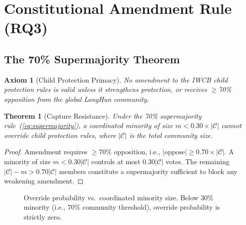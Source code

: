 \documentclass[conference]{IEEEtran}
\newtheorem{theorem}{Theorem}
\newtheorem{axiom}{Axiom}
\begin{document}
\section{Constitutional Amendment Rule (RQ3)}

\subsection{The 70\% Supermajority Theorem}

\begin{axiom}[Child Protection Primacy]
No amendment to the IWCB child protection rules is valid
unless it \emph{strengthens} protection, or receives
$\geq$70\% opposition from the global LongHun community.
\end{axiom}

\begin{theorem}[Capture Resistance]
Under the 70\% supermajority rule~(\ref{eq:supermajority}),
a coordinated minority of size
$m < 0.30 \times |\mathcal{C}|$ cannot override
child protection rules, where $|\mathcal{C}|$ is the
total community size.
\end{theorem}

\begin{proof}
Amendment requires $\geq$70\% opposition, i.e.,
$|\text{oppose}| \geq 0.70 \times |\mathcal{C}|$.
A minority of size $m < 0.30|\mathcal{C}|$ controls
at most $0.30|\mathcal{C}|$ votes.
The remaining $|\mathcal{C}| - m > 0.70|\mathcal{C}|$
members constitute a supermajority sufficient to
block any weakening amendment.
\end{proof}

\begin{figure}[t]
\centering
{}
\caption{Override probability vs.\ coordinated minority size.
  Below 30\% minority (i.e., 70\% community threshold),
  override probability is strictly zero.}
\label{fig:capture}
\end{figure}
\end{document}
